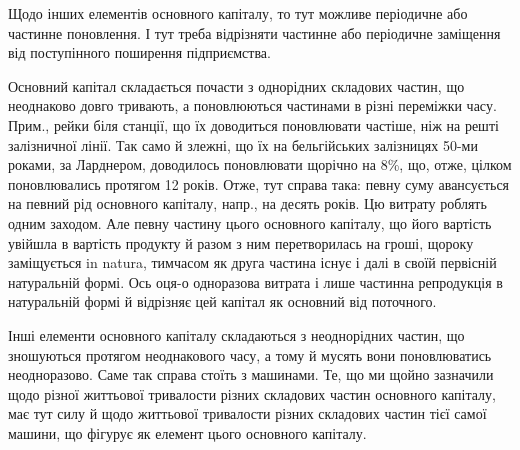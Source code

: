 Щодо інших елементів основного капіталу, то тут можливе періодичне або частинне поновлення. І тут
треба відрізняти частинне або періодичне заміщення від поступінного поширення підприємства.

Основний капітал складається почасти з однорідних складових частин, що неоднаково довго тривають, а
поновлюються частинами в різні переміжки часу. Прим., рейки біля станції, що їх доводиться
поновлювати частіше, ніж на решті залізничної лінії. Так само й злежні, що їх на бельгійських
залізницях 50-ми роками, за Ларднером, доводилось поновлювати щорічно на 8\%, що, отже, цілком
поновлювались протягом 12 років.
Отже, тут справа така: певну суму авансується на певний рід основного капіталу, напр., на
десять років. Цю витрату роблять одним заходом. Але певну частину цього основного капіталу, що його
вартість увійшла в вартість продукту й разом з ним перетворилась на гроші, щороку заміщується in
natura, тимчасом як друга частина існує і далі в своїй первісній натуральній формі. Ось оця-о
одноразова витрата і лише
частинна репродукція в натуральній формі й відрізняє цей капітал як основний від поточного.

Інші елементи основного капіталу складаються з неоднорідних частин, що зношуються протягом
неоднакового часу, а тому й мусять вони поновлюватись неодноразово. Саме так справа стоїть з
машинами. Те, що ми щойно зазначили щодо різної життьової тривалости різних складових частин
основного капіталу, має тут силу й щодо життьової тривалости різних складових частин тієї самої
машини, що фігурує як елемент цього
основного капіталу.

